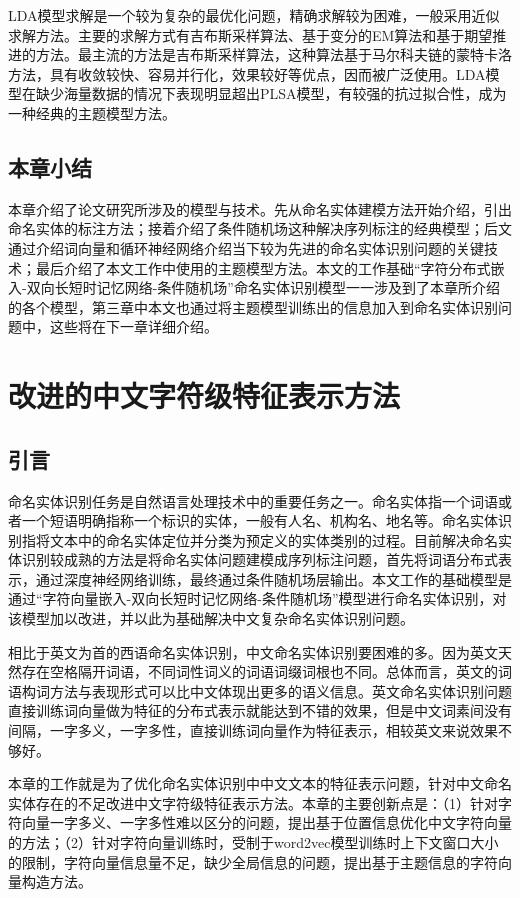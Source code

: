 \documentclass[winfonts,master,oneside,nobackinfo]{njuthesis}
\begin{document}
LDA模型求解是一个较为复杂的最优化问题，精确求解较为困难，一般采用近似求解方法。主要的求解方式有吉布斯采样算法、基于变分的EM算法和基于期望推进的方法。最主流的方法是吉布斯采样算法，这种算法基于马尔科夫链的蒙特卡洛方法，具有收敛较快、容易并行化，效果较好等优点，因而被广泛使用。LDA模型在缺少海量数据的情况下表现明显超出PLSA模型，有较强的抗过拟合性，成为一种经典的主题模型方法。

\section{本章小结}

本章介绍了论文研究所涉及的模型与技术。先从命名实体建模方法开始介绍，引出命名实体的标注方法；接着介绍了条件随机场这种解决序列标注的经典模型；后文通过介绍词向量和循环神经网络介绍当下较为先进的命名实体识别问题的关键技术；最后介绍了本文工作中使用的主题模型方法。本文的工作基础“字符分布式嵌入-双向长短时记忆网络-条件随机场”命名实体识别模型一一涉及到了本章所介绍的各个模型，第三章中本文也通过将主题模型训练出的信息加入到命名实体识别问题中，这些将在下一章详细介绍。

\chapter{改进的中文字符级特征表示方法}

\section{引言}

命名实体识别任务是自然语言处理技术中的重要任务之一。命名实体指一个词语或者一个短语明确指称一个标识的实体，一般有人名、机构名、地名等。命名实体识别指将文本中的命名实体定位并分类为预定义的实体类别的过程。目前解决命名实体识别较成熟的方法是将命名实体问题建模成序列标注问题，首先将词语分布式表示，通过深度神经网络训练，最终通过条件随机场层输出。本文工作的基础模型是通过“字符向量嵌入-双向长短时记忆网络-条件随机场”模型进行命名实体识别，对该模型加以改进，并以此为基础解决中文复杂命名实体识别问题。

相比于英文为首的西语命名实体识别，中文命名实体识别要困难的多。因为英文天然存在空格隔开词语，不同词性词义的词语词缀词根也不同。总体而言，英文的词语构词方法与表现形式可以比中文体现出更多的语义信息。英文命名实体识别问题直接训练词向量做为特征的分布式表示就能达到不错的效果，但是中文词素间没有间隔，一字多义，一字多性，直接训练词向量作为特征表示，相较英文来说效果不够好。

本章的工作就是为了优化命名实体识别中中文文本的特征表示问题，针对中文命名实体存在的不足改进中文字符级特征表示方法。本章的主要创新点是：（1）针对字符向量一字多义、一字多性难以区分的问题，提出基于位置信息优化中文字符向量的方法；（2）针对字符向量训练时，受制于word2vec模型训练时上下文窗口大小的限制，字符向量信息量不足，缺少全局信息的问题，提出基于主题信息的字符向量构造方法。
\end{document}
